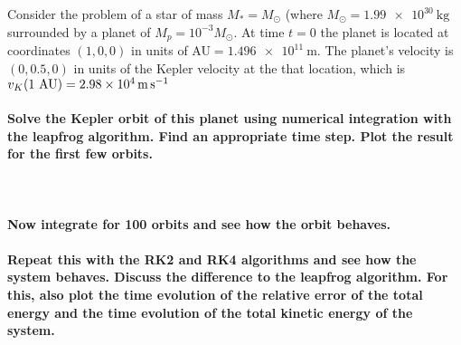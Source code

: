 Consider the problem of a star of mass $M_*=M_\odot$ (where 
$M_\odot=\SI{1.99e30}{\kilogram}$ surrounded by a planet of 
$M_p=10^{-3} M_\odot$. At time $t=0$ the planet is located at 
coordinates $(1,0,0)$ in units of AU$=\SI{1.496e11}{\meter}$. The 
planet's velocity is $(0,0.5,0)$ in units of the Kepler velocity at the 
that location, which is 
$v_K(1\textnormal{ AU})=\SI{2.98e4}{\meter\per\second}$

\paragraph{Solve the Kepler orbit of this planet using numerical
    integration with the leapfrog algorithm. Find an appropriate 
    time step. Plot the result for the first few orbits.
} \ \\

\paragraph{Now integrate for 100 orbits and see how the orbit behaves.}

\paragraph{Repeat this with the RK2 and RK4 algorithms and see how the 
    system behaves. Discuss the difference to the leapfrog algorithm.
    For this, also plot the time evolution of the relative error 
    of the total energy and the time evolution of the total kinetic
    energy of the system.
}
